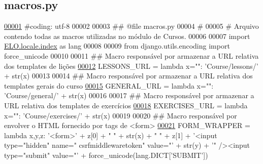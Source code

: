 \hypertarget{macros_8py_source}{}\subsection{macros.\+py}
\label{macros_8py_source}

\begin{DoxyCode}
\hypertarget{macros_8py_source_l00001}{}\hyperlink{namespaceCourse_1_1macros}{00001} \textcolor{comment}{#coding: utf-8}
00002 
00003 \textcolor{comment}{## @file macros.py}
00004 \textcolor{comment}{#}
00005 \textcolor{comment}{#   Arquivo contendo todas as macros utilizadas no módulo de Cursos.}
00006 
00007 \textcolor{keyword}{import} \hyperlink{namespaceELO_1_1locale_1_1index}{ELO.locale.index} \textcolor{keyword}{as} lang
00008 
00009 \textcolor{keyword}{from} django.utils.encoding \textcolor{keyword}{import} force\_unicode
00010 
00011 \textcolor{comment}{## Macro responsável por armazenar a URL relativa dos templates de lições}
\hypertarget{macros_8py_source_l00012}{}\hyperlink{namespaceCourse_1_1macros_a4473a418de016b59cce33b13440e469b}{00012} LESSONS\_URL = \textcolor{keyword}{lambda} x=\textcolor{stringliteral}{""}: \textcolor{stringliteral}{'Course/lessons/'} + str(x)
00013 
00014 \textcolor{comment}{## Macro responsável por armazenar a URL relativa dos templates gerais do curso}
\hypertarget{macros_8py_source_l00015}{}\hyperlink{namespaceCourse_1_1macros_a9a69c2455c0c121b1c01960629575d7e}{00015} GENERAL\_URL = \textcolor{keyword}{lambda} x=\textcolor{stringliteral}{""}: \textcolor{stringliteral}{'Course/general/'} + str(x)
00016 
00017 \textcolor{comment}{## Macro responsável por armazenar a URL relativa dos templates de exercícios}
\hypertarget{macros_8py_source_l00018}{}\hyperlink{namespaceCourse_1_1macros_ac1cf8b3a78128ab6a3bac4f6be9fabbd}{00018} EXERCISES\_URL = \textcolor{keyword}{lambda} x=\textcolor{stringliteral}{""}: \textcolor{stringliteral}{'Course/exercises/'} + str(x)
00019 
00020 \textcolor{comment}{## Macro responsável por envolver o HTML fornecido por tags de <form>}
\hypertarget{macros_8py_source_l00021}{}\hyperlink{namespaceCourse_1_1macros_a39e2016892066b4da954490ccc32533e}{00021} FORM\_WRAPPER = \textcolor{keyword}{lambda} x,y,z: \textcolor{stringliteral}{'<form>'} + z[0] + \textcolor{stringliteral}{" "} + str(x) + \textcolor{stringliteral}{" "} + z[1] + \textcolor{stringliteral}{'<input type="hidden" name="
      csrfmiddlewaretoken" value="'} + str(y) + \textcolor{stringliteral}{'" /><input type="submit" value="'} + force\_unicode(lang.DICT[\textcolor{stringliteral}{'SUBMIT'}])

\end{DoxyCode}
